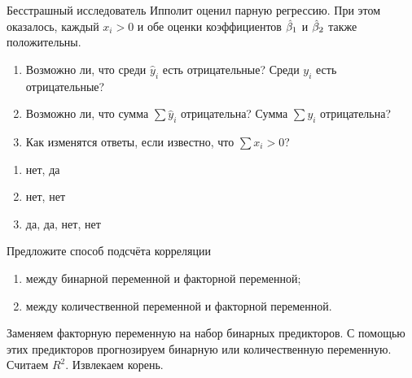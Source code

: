 \begin{problem}
Бесстрашный исследователь Ипполит оценил парную регрессию. При этом оказалось,
каждый $x_i >0$ и обе оценки коэффициентов $\hat{\beta}_1$ и $\hat{\beta}_2$ также положительны.

\begin{enumerate}
  \item Возможно ли, что среди $\hat y_i$ есть отрицательные? Среди $y_i$ есть отрицательные?
  \item Возможно ли, что сумма $\sum \hat y_i$ отрицательна? Сумма $\sum y_i$ отрицательна?
  \item Как изменятся ответы, если известно, что $\sum x_i >0$?
\end{enumerate}

\begin{sol}
  \begin{enumerate}
    \item нет, да
    \item нет, нет
    \item да, да, нет, нет
  \end{enumerate}
\end{sol}
\end{problem}



\begin{problem}
Предложите способ подсчёта корреляции
\begin{enumerate}
  \item между бинарной переменной и факторной переменной;
  \item между количественной переменной и факторной переменной.
\end{enumerate}
  \begin{sol}
    Заменяем факторную переменную на набор бинарных предикторов. 
    С помощью этих предикторов прогнозируем бинарную или количественную переменную.
    Считаем $R^2$. Извлекаем корень. 
  \end{sol}
\end{problem}
  



